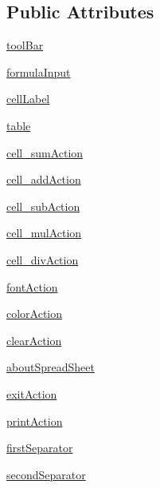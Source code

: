 \subsection*{Public Attributes}
\begin{DoxyCompactItemize}
\item 
\hyperlink{classspreadsheet_1_1SpreadSheet_a06c4457678a4e54b501687b61941d6cf}{tool\+Bar}
\item 
\hyperlink{classspreadsheet_1_1SpreadSheet_a0ae549f889a1c1638cca9deed0ae57ca}{formula\+Input}
\item 
\hyperlink{classspreadsheet_1_1SpreadSheet_a07a9634d8a448e377c6cf722a562dd5d}{cell\+Label}
\item 
\hyperlink{classspreadsheet_1_1SpreadSheet_a4cffe6375bcad3a8250d0f843fdb4476}{table}
\item 
\hyperlink{classspreadsheet_1_1SpreadSheet_a1f1d6d3d23e632a30bc7bb0b8fcbcea0}{cell\+\_\+sum\+Action}
\item 
\hyperlink{classspreadsheet_1_1SpreadSheet_abf890a5d2103be1b04648c14b63d152b}{cell\+\_\+add\+Action}
\item 
\hyperlink{classspreadsheet_1_1SpreadSheet_abfec2406e553eef100d680e71920f75f}{cell\+\_\+sub\+Action}
\item 
\hyperlink{classspreadsheet_1_1SpreadSheet_ac0a6dca0b7232074cfb357fe0075164c}{cell\+\_\+mul\+Action}
\item 
\hyperlink{classspreadsheet_1_1SpreadSheet_aa4ccd6d746a40cbf9db36d60e11678cf}{cell\+\_\+div\+Action}
\item 
\hyperlink{classspreadsheet_1_1SpreadSheet_a23cf1fecf0179e9e92002d82be984946}{font\+Action}
\item 
\hyperlink{classspreadsheet_1_1SpreadSheet_a8fab9dc829531ae798c795962300bdc6}{color\+Action}
\item 
\hyperlink{classspreadsheet_1_1SpreadSheet_a8b7e7ebbf6c87c2220298df21a91b6fd}{clear\+Action}
\item 
\hyperlink{classspreadsheet_1_1SpreadSheet_a2aa0416b4d19770fce20009e6d0d4e11}{about\+Spread\+Sheet}
\item 
\hyperlink{classspreadsheet_1_1SpreadSheet_a0742e8ee2838bfda55851f3eab3dcc03}{exit\+Action}
\item 
\hyperlink{classspreadsheet_1_1SpreadSheet_a7b9a9e53424a65c151e43ec7cc18ad95}{print\+Action}
\item 
\hyperlink{classspreadsheet_1_1SpreadSheet_a0dff54398e7a26b50324db27b165b8ba}{first\+Separator}
\item 
\hyperlink{classspreadsheet_1_1SpreadSheet_a1d66280450decf77a4ea246ee882e683}{second\+Separator}

\end{DoxyCompactItemize}
